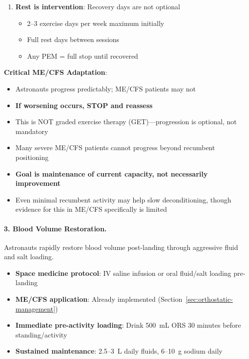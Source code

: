 \begin{tcolorbox}[colback=green!5!white,colframe=green!75!black,title=Space Medicine Reconditioning Principles for ME/CFS]
\begin{enumerate}
    \item \textbf{Rest is intervention}: Recovery days are not optional
    \begin{itemize}
        \item 2--3 exercise days per week maximum initially
        \item Full rest days between sessions
        \item Any PEM = full stop until recovered
    \end{itemize}
\end{enumerate}

\textbf{Critical ME/CFS Adaptation}:
\begin{itemize}
    \item Astronauts progress predictably; ME/CFS patients may not
    \item \textbf{If worsening occurs, STOP and reassess}
    \item This is NOT graded exercise therapy (GET)---progression is optional, not mandatory
    \item Many severe ME/CFS patients cannot progress beyond recumbent positioning
    \item \textbf{Goal is maintenance of current capacity, not necessarily improvement}
    \item Even minimal recumbent activity may help slow deconditioning, though evidence for this in ME/CFS specifically is limited
\end{itemize}

\end{tcolorbox}

\paragraph{3. Blood Volume Restoration.}
Astronauts rapidly restore blood volume post-landing through aggressive fluid and salt loading.

\begin{itemize}
    \item \textbf{Space medicine protocol}: IV saline infusion or oral fluid/salt loading pre-landing
    \item \textbf{ME/CFS application}: Already implemented (Section~\ref{sec:orthostatic-management})
    \item \textbf{Immediate pre-activity loading}: Drink 500~mL ORS 30 minutes before standing/activity
    \item \textbf{Sustained maintenance}: 2.5--3~L daily fluids, 6--10~g sodium daily
\end{itemize}

